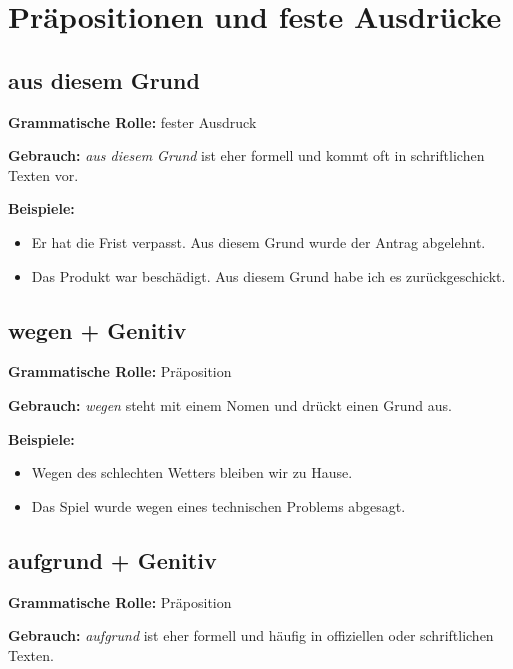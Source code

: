 \documentclass[a4paper]{article}
\begin{document}
    
    \section{Präpositionen und feste Ausdrücke}
        
        \subsection{aus diesem Grund}
            
            \textbf{Grammatische Rolle:} fester Ausdruck
            
            \textbf{Gebrauch:} \emph{aus diesem Grund} ist eher formell und kommt oft in schriftlichen Texten vor.
            
            \textbf{Beispiele:}
            \begin{itemize}
                \item Er hat die Frist verpasst. Aus diesem Grund wurde der Antrag abgelehnt.
                \item Das Produkt war beschädigt. Aus diesem Grund habe ich es zurückgeschickt.
            \end{itemize}
        
        \subsection{wegen + Genitiv}
            
            \textbf{Grammatische Rolle:} Präposition
            
            \textbf{Gebrauch:} \emph{wegen} steht mit einem Nomen und drückt einen Grund aus.
            
            \textbf{Beispiele:}
            \begin{itemize}
                \item Wegen des schlechten Wetters bleiben wir zu Hause.
                \item Das Spiel wurde wegen eines technischen Problems abgesagt.
            \end{itemize}
        
        \subsection{aufgrund + Genitiv}
            
            \textbf{Grammatische Rolle:} Präposition
            
            \textbf{Gebrauch:} \emph{aufgrund} ist eher formell und häufig in offiziellen oder schriftlichen Texten.
            
\end{document}
